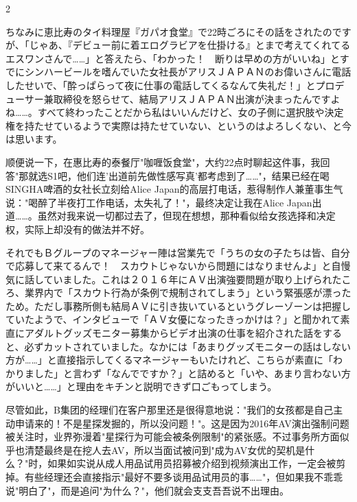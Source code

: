 \documentclass[12pt,UTF8]{ctexbook}
\begin{document}
\begin{paracol}{2}
\switchcolumn*

ちなみに恵比寿のタイ料理屋『ガパオ食堂』で22時ごろにその話をされたのですが、「じゃあ、『デビュー前に着エログラビアを仕掛ける』とまで考えてくれてるエスワンさんで……」と答えたら、「わかった！　断りは早めの方がいいね」とすでにシンハービールを嗜んでいた女社長がアリスＪＡＰＡＮのお偉いさんに電話したせいで、「酔っぱらって夜に仕事の電話してくるなんて失礼だ！」とプロデューサー兼取締役を怒らせて、結局アリスＪＡＰＡＮ出演が決まったんですよね……。すべて終わったことだから私はいいんだけど、女の子側に選択肢や決定権を持たせているようで実際は持たせていない、というのはよろしくない、と今は思います。

\switchcolumn

顺便说一下，在惠比寿的泰餐厅"咖喱饭食堂"，大约22点时聊起这件事，我回答"那就选S1吧，他们连'出道前先做性感写真'都考虑到了……"，结果已经在喝SINGHA啤酒的女社长立刻给Alice Japan的高层打电话，惹得制作人兼董事生气说："喝醉了半夜打工作电话，太失礼了！"，最终决定让我在Alice Japan出道……。虽然对我来说一切都过去了，但现在想想，那种看似给女孩选择和决定权，实际上却没有的做法并不好。

\switchcolumn*

それでもＢグループのマネージャー陣は営業先で「うちの女の子たちは皆、自分で応募して来てるんで！　スカウトじゃないから問題にはなりませんよ」と自慢気に話していました。これは２０１６年にＡＶ出演強要問題が取り上げられたころ、業界内で「スカウト行為が条例で規制されてしまう」という緊張感が漂ったため。ただし事務所側も結局ＡＶに引き抜いているというグレーゾーンは把握していたようで、インタビューで「ＡＶ女優になったきっかけは？」と聞かれて素直にアダルトグッズモニター募集からビデオ出演の仕事を紹介された話をすると、必ずカットされていました。なかには「あまりグッズモニターの話はしない方が……」と直接指示してくるマネージャーもいたけれど、こちらが素直に「わかりました」と言わず「なんでですか？」と詰めると「いや、あまり言わない方がいいと……」と理由をキチンと説明できず口ごもってしまう。

\switchcolumn

尽管如此，B集团的经理们在客户那里还是很得意地说："我们的女孩都是自己主动申请来的！不是星探发掘的，所以没问题！"。这是因为2016年AV演出强制问题被关注时，业界弥漫着"星探行为可能会被条例限制"的紧张感。不过事务所方面似乎也清楚最终是在挖人去AV，所以当面试被问到"成为AV女优的契机是什么？"时，如果如实说从成人用品试用员招募被介绍到视频演出工作，一定会被剪掉。有些经理还会直接指示"最好不要多谈用品试用员的事……"，但如果我不乖乖说"明白了"，而是追问"为什么？"，他们就会支支吾吾说不出理由。

\switchcolumn*


\end{paracol}
\end{document}
